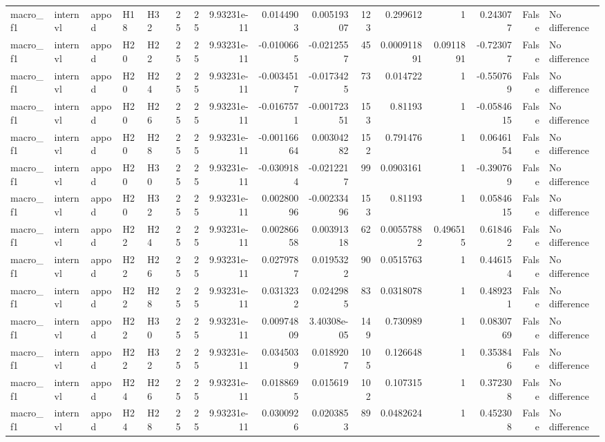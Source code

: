 \begin{longtable}{lllllrrrrrrrrrrl}
macro\_f1 & internvl & appod & H18 & H32 & 25 & 25 & 9.93231e-11 & 0.0144903 & 0.00519307 & 123 & 0.299612 & 1 & 0.243077 & False & No difference \\
macro\_f1 & internvl & appod & H20 & H22 & 25 & 25 & 9.93231e-11 & -0.0100665 & -0.0212557 & 45 & 0.000911891 & 0.0911891 & -0.723077 & False & No difference \\
macro\_f1 & internvl & appod & H20 & H24 & 25 & 25 & 9.93231e-11 & -0.0034517 & -0.0173425 & 73 & 0.014722 & 1 & -0.550769 & False & No difference \\
macro\_f1 & internvl & appod & H20 & H26 & 25 & 25 & 9.93231e-11 & -0.0167571 & -0.00172351 & 153 & 0.81193 & 1 & -0.0584615 & False & No difference \\
macro\_f1 & internvl & appod & H20 & H28 & 25 & 25 & 9.93231e-11 & -0.00116664 & 0.00304282 & 152 & 0.791476 & 1 & 0.0646154 & False & No difference \\
macro\_f1 & internvl & appod & H20 & H30 & 25 & 25 & 9.93231e-11 & -0.0309184 & -0.0212217 & 99 & 0.0903161 & 1 & -0.390769 & False & No difference \\
macro\_f1 & internvl & appod & H20 & H32 & 25 & 25 & 9.93231e-11 & 0.00280096 & -0.00233496 & 153 & 0.81193 & 1 & 0.0584615 & False & No difference \\
macro\_f1 & internvl & appod & H22 & H24 & 25 & 25 & 9.93231e-11 & 0.00286658 & 0.00391318 & 62 & 0.00557882 & 0.496515 & 0.618462 & False & No difference \\
macro\_f1 & internvl & appod & H22 & H26 & 25 & 25 & 9.93231e-11 & 0.0279787 & 0.0195322 & 90 & 0.0515763 & 1 & 0.446154 & False & No difference \\
macro\_f1 & internvl & appod & H22 & H28 & 25 & 25 & 9.93231e-11 & 0.0313232 & 0.0242985 & 83 & 0.0318078 & 1 & 0.489231 & False & No difference \\
macro\_f1 & internvl & appod & H22 & H30 & 25 & 25 & 9.93231e-11 & 0.00974809 & 3.40308e-05 & 149 & 0.730989 & 1 & 0.0830769 & False & No difference \\
macro\_f1 & internvl & appod & H22 & H32 & 25 & 25 & 9.93231e-11 & 0.0345039 & 0.0189207 & 105 & 0.126648 & 1 & 0.353846 & False & No difference \\
macro\_f1 & internvl & appod & H24 & H26 & 25 & 25 & 9.93231e-11 & 0.0188695 & 0.015619 & 102 & 0.107315 & 1 & 0.372308 & False & No difference \\
macro\_f1 & internvl & appod & H24 & H28 & 25 & 25 & 9.93231e-11 & 0.0300926 & 0.0203853 & 89 & 0.0482624 & 1 & 0.452308 & False & No difference \\

\end{longtable}
